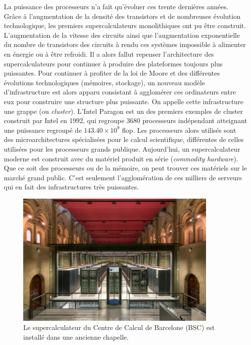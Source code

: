     La puissance des processeurs n'a fait qu'évoluer ces trente dernières années. Grâce à l'augmentation de la densité des transistors et de nombreuses évolution technologique, les premiers supercalculateurs monolithiques ont pu être construit. L'augmentation de la vitesse des circuits ainsi que l'augmentation exponentielle du nombre de transistors des circuits à rendu ces systèmes impossible à alimenter en énergie ou à être refroidi. Il a alors fallut repenser l'architecture des supercalculateurs pour continuer à produire des plateformes toujours plus puissantes. Pour continuer à profiter de la loi de Moore et des différentes évolutions technologiques (mémoires, stockage), un nouveau modèle d'infrastructure est alors apparu consistant à agglomérer ces ordinateurs entre eux pour construire une structure plus puissante. On appelle cette infrastructure une grappe (ou \textit{cluster}). L'Intel Paragon est un des premiers exemples de cluster construit par Intel en 1992, qui regroupe 3680 processeurs indépendant atteignant une puissance regroupé de $143.40 \times 10^9$ flop. Les processeurs alors utilisés sont des microarchitectures spécialisées pour le calcul scientifique, différentes de celles utilisées pour les processeurs grands publique. Aujourd'hui, un supercalculateur moderne est construit avec du matériel produit en série (\textit{commodity hardware}). Que ce soit des processeurs ou de la mémoire, on peut trouver ces matériels sur le marché grand public. C'est seulement l'agglomération de ces milliers de serveurs qui en fait des infrastructures très puissantes. 
    

    \begin{figure}
        \center
        \includegraphics[width=10cm]{images/hpc_bsc_super.jpg}
        \caption{\label{fig:hpc_bsc_super} Le supercalculateur du Centre de Calcul de Barcelone (BSC) est installé dans une ancienne chapelle.}
    \end{figure}

